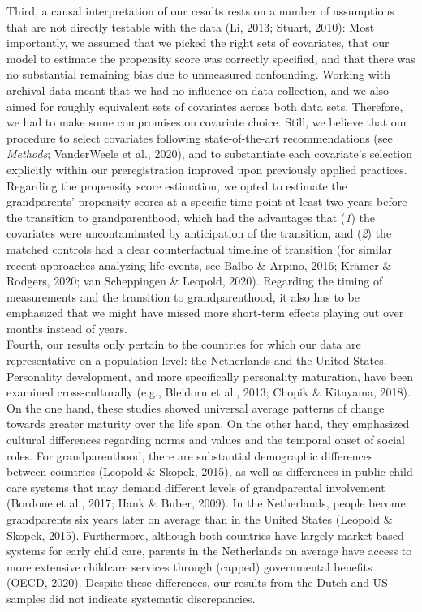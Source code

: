 \documentclass[
  english,
  man,floatsintext]{apa7}
\begin{document}
Third, a causal interpretation of our results rests on a number of assumptions that are not directly testable with the data (Li, 2013; Stuart, 2010): Most importantly, we assumed that we picked the right sets of covariates, that our model to estimate the propensity score was correctly specified, and that there was no substantial remaining bias due to unmeasured confounding. Working with archival data meant that we had no influence on data collection, and we also aimed for roughly equivalent sets of covariates across both data sets. Therefore, we had to make some compromises on covariate choice. Still, we believe that our procedure to select covariates following state-of-the-art recommendations (see \emph{Methods}; VanderWeele et al., 2020), and to substantiate each covariate's selection explicitly within our preregistration improved upon previously applied practices. Regarding the propensity score estimation, we opted to estimate the grandparents' propensity scores at a specific time point at least two years before the transition to grandparenthood, which had the advantages that (\emph{1}) the covariates were uncontaminated by anticipation of the transition, and (\emph{2}) the matched controls had a clear counterfactual timeline of transition (for similar recent approaches analyzing life events, see Balbo \& Arpino, 2016; Krämer \& Rodgers, 2020; van Scheppingen \& Leopold, 2020). Regarding the timing of measurements and the transition to grandparenthood, it also has to be emphasized that we might have missed more short-term effects playing out over months instead of years.\\
Fourth, our results only pertain to the countries for which our data are representative on a population level: the Netherlands and the United States. Personality development, and more specifically personality maturation, have been examined cross-culturally (e.g., Bleidorn et al., 2013; Chopik \& Kitayama, 2018). On the one hand, these studies showed universal average patterns of change towards greater maturity over the life span. On the other hand, they emphasized cultural differences regarding norms and values and the temporal onset of social roles. For grandparenthood, there are substantial demographic differences between countries (Leopold \& Skopek, 2015), as well as differences in public child care systems that may demand different levels of grandparental involvement (Bordone et al., 2017; Hank \& Buber, 2009). In the Netherlands, people become grandparents six years later on average than in the United States (Leopold \& Skopek, 2015). Furthermore, although both countries have largely market-based systems for early child care, parents in the Netherlands on average have access to more extensive childcare services through (capped) governmental benefits (OECD, 2020). Despite these differences, our results from the Dutch and US samples did not indicate systematic discrepancies.\\
\end{document}
